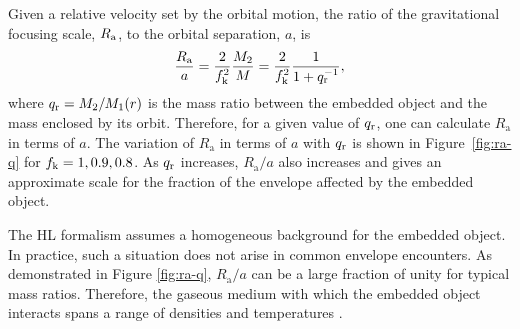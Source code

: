 Given a relative velocity set by the orbital motion, the ratio of the gravitational focusing scale, $R_{\rm a}$, to the orbital separation, $a$, is \cite{MacLeod:2017}
\begin{equation}
\frac{R_{\mathrm a}}{a} = \frac{2}{f_{\rm k}^{2}}\frac{M_{2}}{M} = \frac{2}{f_{\rm k}^{2}}\frac{1}{1 + q_{\rm r}^{-1}},\label{eq:Ra_asfunc_a}
\end{equation}
where $q_{\rm r}=M_{2}/M_{1}(r)$ is the mass ratio between the embedded object and the mass enclosed by its orbit. Therefore, for a given value of $q_{\rm r}$, one can calculate $R_{\mathrm a}$ in terms of $a$. The variation of $R_{\mathrm a}$ in terms of $a$ with $q_{\rm r}$ is shown in Figure~\ref{fig:ra-q} for $f_{\rm k}=1, 0.9, 0.8$. As $q_{\rm r}$ increases, $R_{\mathrm a}/a$ also increases and gives an approximate scale for the fraction of the envelope affected by the embedded object.

The HL formalism assumes a homogeneous background for the embedded object. In practice, such a situation does not arise in common envelope encounters. As demonstrated in Figure \ref{fig:ra-q},  $R_{\mathrm{a}}/a$ can be a large fraction of unity for typical mass ratios. Therefore, the gaseous medium with which the embedded object interacts spans a range of densities and temperatures \cite{MacLeod_2015}. 

